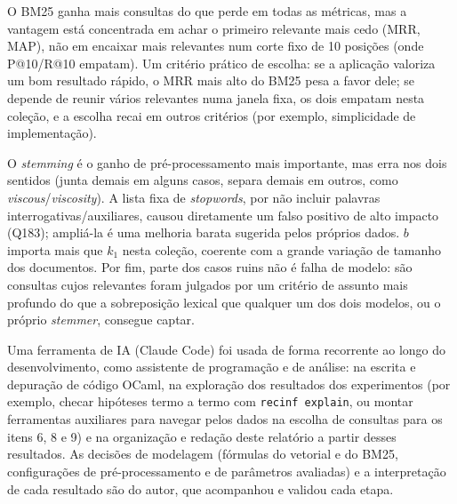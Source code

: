 \documentclass[11pt,a4paper]{article}
\makeatletter
\renewcommand{\section}{\@startsection{section}{1}{0pt}{7pt}{3pt}{\normalfont\large\bfseries}}
\newcommand{\code}[1]{\texttt{\footnotesize #1}}
\makeatother
\begin{document}
O BM25 ganha mais consultas do que perde em todas as métricas, mas a vantagem está concentrada em achar
o primeiro relevante mais cedo (MRR, MAP), não em encaixar mais relevantes num corte fixo de 10
posições (onde P@10/R@10 empatam). Um critério prático de escolha: se a aplicação valoriza um bom
resultado rápido, o MRR mais alto do BM25 pesa a favor dele; se depende de reunir vários relevantes numa
janela fixa, os dois empatam nesta coleção, e a escolha recai em outros critérios (por exemplo,
simplicidade de implementação).

O \textit{stemming} é o ganho de pré-processamento mais importante, mas erra nos dois sentidos (junta
demais em alguns casos, separa demais em outros, como \textit{viscous}/\textit{viscosity}). A lista fixa
de \textit{stopwords}, por não incluir palavras interrogativas/auxiliares, causou diretamente um falso
positivo de alto impacto (Q183); ampliá-la é uma melhoria barata sugerida pelos próprios dados. $b$
importa mais que $k_1$ nesta coleção, coerente com a grande variação de tamanho dos documentos. Por fim,
parte dos casos ruins não é falha de modelo: são consultas cujos relevantes foram julgados por um
critério de assunto mais profundo do que a sobreposição lexical que qualquer um dos dois modelos, ou o
próprio \textit{stemmer}, consegue captar.

\section{Uso de Ferramentas de IA}
\label{sec:ia}

Uma ferramenta de IA (Claude Code) foi usada de forma recorrente ao longo do desenvolvimento, como
assistente de programação e de análise: na escrita e depuração de código OCaml, na exploração dos
resultados dos experimentos (por exemplo, checar hipóteses termo a termo com \code{recinf explain}, ou
montar ferramentas auxiliares para navegar pelos dados na escolha de consultas para os itens 6, 8 e 9) e
na organização e redação deste relatório a partir desses resultados. As decisões de modelagem (fórmulas
do vetorial e do BM25, configurações de pré-processamento e de parâmetros avaliadas) e a interpretação
de cada resultado são do autor, que acompanhou e validou cada etapa.
\end{document}
